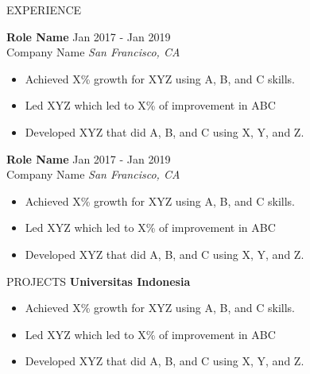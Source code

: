 \documentclass{resume} %
\begin{document}
\begin{rSection}{EXPERIENCE}

\textbf{Role Name} \hfill Jan 2017 - Jan 2019\\
Company Name \hfill \textit{San Francisco, CA}
\vspace{-0.5em}
\begin{itemize}
\itemsep -7pt {} 
     \item Achieved X\% growth for XYZ using A, B, and C skills.
     \item Led XYZ which led to X\% of improvement in ABC
     \item Developed XYZ that did A, B, and C using X, Y, and Z. 
 \end{itemize}
 
\textbf{Role Name} \hfill Jan 2017 - Jan 2019\\
Company Name \hfill \textit{San Francisco, CA}
\vspace{-0.5em}
 \begin{itemize}
    \itemsep -3pt {} 
     \item Achieved X\% growth for XYZ using A, B, and C skills.
     \item Led XYZ which led to X\% of improvement in ABC
    \item Developed XYZ that did A, B, and C using X, Y, and Z. 
 \end{itemize}

\end{rSection} 


\begin{rSection}{PROJECTS}
{\bf Universitas Indonesia}
\vspace{-0.5em}
\begin{itemize}
\itemsep -7pt {} 
     \item Achieved X\% growth for XYZ using A, B, and C skills.
     \item Led XYZ which led to X\% of improvement in ABC
     \item Developed XYZ that did A, B, and C using X, Y, and Z. 
 \end{itemize}
 \vspace{-0.25em}
\end{rSection} 
\end{document}

